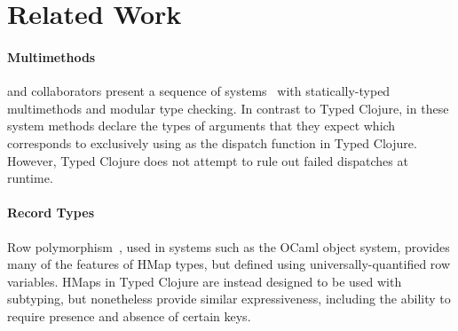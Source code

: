 \section{Related Work}

\paragraph{Multimethods} 
\citeauthor{MS02} and collaborators present a sequence of
systems~\cite{Chambers:1992:OMC, Chambers:1994:TMM, MS02} with statically-typed multimethods
and modular type checking.  In contrast to Typed Clojure, in these
system methods declare the types of arguments that they expect which
corresponds to exclusively using  as the dispatch function
in Typed Clojure. However, Typed Clojure does not attempt to rule out
failed dispatches at runtime.







\paragraph{Record Types} Row polymorphism~\cite{Wand89typeinference,CM91,HP91}, used
in systems such as the OCaml object system, provides many of the
features of HMap types, but defined using universally-quantified row
variables. HMaps in Typed Clojure are instead designed to be used with
subtyping, but nonetheless provide similar expressiveness, including
the ability to require presence and absence of certain keys. 

